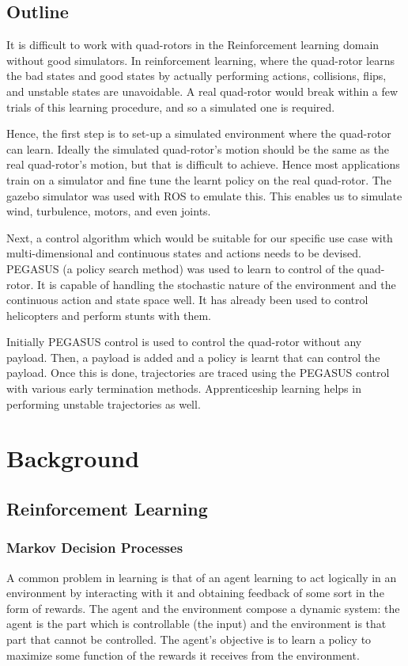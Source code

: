 \documentclass[hidelinks,BTech]{iitmdiss}
\begin{document}
\section{Outline}

It is difficult to work with quad-rotors in the Reinforcement learning domain without good simulators. In reinforcement learning, where the quad-rotor learns the bad states and good states by actually performing actions, collisions, flips, and unstable states are unavoidable. A real quad-rotor would break within a few trials of this learning procedure, and so a simulated one is required.

Hence, the first step is to set-up a simulated environment where the quad-rotor can learn. Ideally the simulated quad-rotor's motion should be the same as the real quad-rotor's motion, but that is difficult to achieve. Hence most applications train on a simulator and fine tune the learnt policy on the real quad-rotor. The gazebo simulator was used with ROS to emulate this. This enables us to simulate wind, turbulence, motors, and even joints.

Next, a control algorithm which would be suitable for our specific use case with multi-dimensional and continuous states and actions needs to be devised. PEGASUS (a policy search method) was used to learn to control of the quad-rotor. It is capable of handling the stochastic nature of the environment and the continuous action and state space well. It has already been used to control helicopters and perform stunts with them.

Initially PEGASUS control is used to control the quad-rotor without any payload. Then, a payload is added and a policy is learnt that can control the payload. Once this is done, trajectories are traced using the PEGASUS control with various early termination methods. Apprenticeship learning helps in performing unstable trajectories as well.

\chapter{Background}

\section{Reinforcement Learning}

\subsection{Markov Decision Processes}
A common problem in learning is that of an agent learning to act logically in an environment by interacting with it and obtaining feedback of some sort in the form of rewards. The agent and the environment compose a dynamic system: the agent is the part which is controllable (the input) and the environment is that part that cannot be controlled. The agent's objective is to learn a policy to maximize some function of the rewards it receives from the environment.
\end{document}
